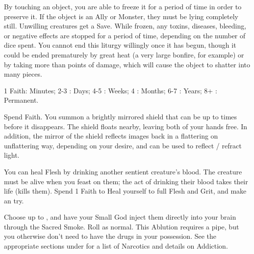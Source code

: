 \begin{multicols*}{2}
\LITURGY [
  Name = Preserve,
  Link = arcana-mystery-preserve,
  Paradigm = J{\UmlautO}tnar
]

By touching an object, you are able to freeze it for a period of time in order to preserve it.  If the object is an Ally or Monster, they must be lying completely still.  Unwilling creatures get a Save.  While frozen, any toxins, diseases, bleeding, or negative effects are stopped for a period of time, depending on the number of dice spent.  You cannot end this liturgy willingly once it has begun, though it could be ended prematurely by great heat (a very large bonfire, for example) or by taking more than \SUMDICE points of damage, which will cause the object to shatter into many pieces.  

1 Faith: Minutes; 2-3 \DICE: Days; 4-5 \DICE: Weeks; 4 \DICE: Months; 6-7 \DICE: Years; 8+ \DICE: Permanent. 


\LITURGY [
  Name = Revered Aegis,
  Link = arcana-mystery-revered-aegis,
  Paradigm = Righteous
]

Spend \DICE Faith. You summon a brightly mirrored shield that can be  up to \DICE times before it disappears.  The shield floats nearby, leaving both of your hands free.  In addition, the mirror of the shield reflects images back in a flattering on unflattering way, depending on your desire, and can be used to reflect / refract light. 


\LITURGY [
  Name = Sanguine Remedy,
  Link = arcana-mystery-sanguine-remedy,
  Paradigm = Cthonic
]

You can heal Flesh by drinking another sentient creature's blood.  The creature must be alive when you feast on them; the act of drinking their blood takes their life (kills them).  Spend 1 Faith to Heal yourself to full Flesh and Grit, and make an \INSANITY try.

\newpage

\LITURGY [
  Name = Sacred Smoke,
  Link = arcana-mystery-sacred-smoke,
  Paradigm = Heathen
]

Choose up to \DICE {}, and have your Small God inject them directly into your brain through the Sacred Smoke. Roll  as normal. This Ablution requires a pipe, but you otherwise don't need to have the drugs in your possession.  See the appropriate sections under  for a list of Narcotics and details on Addiction.


\end{multicols*}
